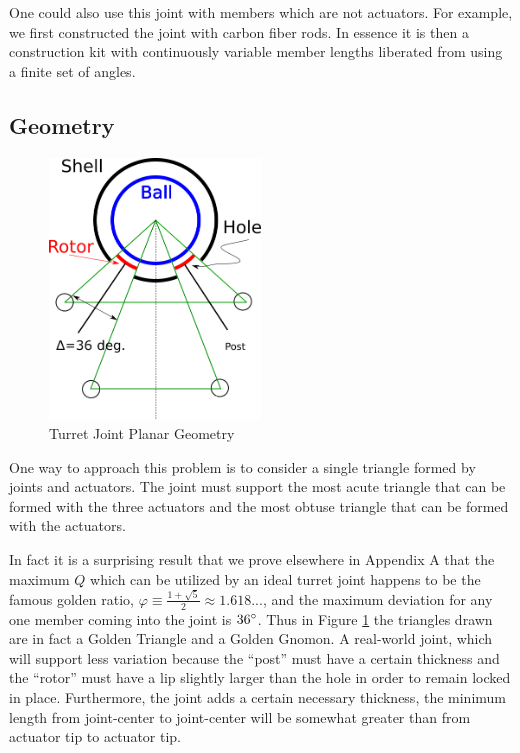 \documentclass[11pt]{article}
\begin{document}
One could also use this joint with members which are not actuators. For example, we first
constructed the joint with carbon fiber rods. In essence it is then a construction kit with continuously
variable member lengths liberated from using a finite set of angles.

\subsection{Geometry}

\begin{figure}[H]
  \centering
  \includegraphics[width=0.5\textwidth]{figures/SimplifiedConstraintDrawing.png}
    \caption[Turret Joint Planar Geometry]{Turret Joint Planar Geometry}
      \label{simplified-constraint-drawing}
\end{figure}

One way to approach this problem is to consider a single triangle formed by joints and actuators.
The joint must support the most acute triangle
that can be formed with the three actuators and the most obtuse triangle that can be formed with the actuators.

In fact it is a surprising result that we prove elsewhere \cite{readglussbot} in Appendix A that the maximum $Q$ which can be utilized
by an ideal turret joint happens to be
the famous golden ratio, $\varphi \equiv \frac{1 + \sqrt{5}}{2} \approx 1.618...$, and the maximum deviation for any one member coming
into the joint is $36\degree$.
Thus in Figure \ref{simplified-constraint-drawing} the triangles drawn are in fact a Golden Triangle and a Golden Gnomon.
A real-world joint, which will support less variation because the ``post'' must have a
certain thickness and the ``rotor'' must have a lip
slightly larger than the hole in order to remain locked in place.
Furthermore, the joint adds a certain necessary thickness, the minimum length
 from joint-center to joint-center will be somewhat greater than from actuator tip to actuator tip.
\end{document}
